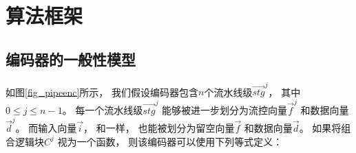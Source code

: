 %
%
%
%
%
%
%


\section{算法框架}\label{sec_framework}


\subsection{编码器的一般性模型}
如图\ref{fig_pipeenc}所示，
我们假设编码器包含$n$个流水线级$\vec{stg}^j$，
其中$0\le j \le n-1$。
每一个流水线级$\vec{stg}^j$ 能够被进一步划分为流控向量$\vec{f}^j$ 和数据向量$\vec{d}^j$。
而输入向量$\vec{i}$，
和一样，
也能被划分为留空向量$\vec{f}$ 和数据向量$\vec{d}$。
如果将组合逻辑块$C^j$ 视为一个函数，
则该编码器可以使用下列等式定义：

